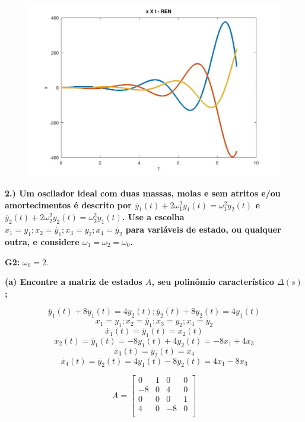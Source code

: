 \documentclass[11pt]{article}
\begin{document}
\begin{figure}[h!]
  \includegraphics[scale=0.28]{plot1g2.jpg}
  \centering
\end{figure}


\vspace{\baselineskip}

\textbf{2.) Um oscilador ideal com duas massas, molas e sem atritos e/ou amortecimentos é descrito por $\ddot{y_1}(t) + 2\omega_1^2 y_1(t) = \omega_1^2 y_2(t)$ e $\ddot{y_2}(t) + 2\omega_2^2 y_2(t) = \omega_2^2 y_1(t)$. Use a escolha $x_1 = y_1; x_2 = \dot{y_1}; x_3 = y_2; x_4 = \dot{y_2}$ para variáveis de estado, ou qualquer outra, e considere $\omega_1 = \omega_2 = \omega_0$.}

\textbf{G2: } $\omega_0 = 2$.

\textbf{(a) Encontre a matriz de estados $A$, seu polinômio característico $\Delta(s)$;}

\[\ddot{y_1}(t) + 8 y_1(t) = 4 y_2(t) ; \ddot{y_2}(t) + 8 y_2(t) = 4 y_1(t)\]
\[x_1 = y_1; x_2 = \dot{y_1}; x_3 = y_2; x_4 = \dot{y_2}\]
\[\dot{x_1}(t) = \dot{y_1}(t) = x_2(t)\]
\[\dot{x_2}(t) = \ddot{y_1}(t) = - 8 y_1(t) + 4 y_2(t) = - 8 x_1 + 4 x_3\]
\[\dot{x_3}(t) = \dot{y_2}(t) = x_4\]
\[\dot{x_4}(t) = \ddot{y_2}(t) = 4 y_1(t) - 8 y_2(t) = 4 x_1 - 8 x_3\]

\[A = \left[ {\begin{array}{cccc}
  0 & 1 & 0 & 0 \\
  -8 & 0 & 4 & 0 \\
  0 & 0 & 0 & 1 \\
  4 & 0 & -8 & 0 \\
\end{array} } \right]\]
\end{document}
